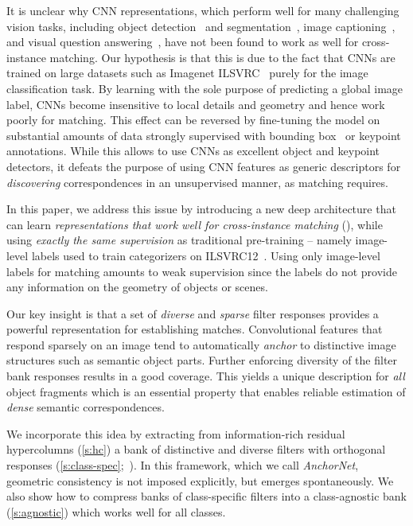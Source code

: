\documentclass[10pt,twocolumn,letterpaper]{article}
\begin{document}
It is unclear why CNN representations, which perform well for many challenging vision tasks, including object detection~\cite{girshick15fastrcnn} and segmentation~\cite{long15fcn}, image captioning~\cite{vinyals15show}, and visual question answering~\cite{antol15VQA}, have not been found to work as well for cross-instance matching. Our hypothesis is that this is due to the fact that CNNs are trained on large datasets such as Imagenet ILSVRC~\cite{deng09imagenet}  purely for the image classification task. By learning with the sole purpose of predicting a global image label, CNNs become insensitive to local details and geometry and hence work poorly for matching. This effect can be reversed by fine-tuning the model on substantial amounts of data strongly supervised with bounding box~\cite{girshick15fastrcnn} or keypoint \cite{choy16universal} annotations. While this allows to use CNNs as excellent object and keypoint detectors, it defeats the purpose of using CNN features as generic descriptors for \emph{discovering} correspondences in an unsupervised manner, as matching requires.

In this paper, we address this issue by introducing a new deep architecture %
that can learn \textit{representations that work well for cross-instance matching} (), while using \textit{exactly the same supervision} as traditional pre-training -- namely image-level labels used to train categorizers on ILSVRC12~\cite{deng09imagenet}. Using only image-level labels for matching amounts to weak supervision since the labels do not provide any information on the geometry of objects or scenes. 

Our key insight is that a set of \emph{diverse} and \emph{sparse} filter responses provides a powerful representation
for establishing matches. Convolutional features that respond sparsely on an image tend to automatically \emph{anchor} to distinctive image structures such as semantic object parts. Further enforcing diversity of the filter bank responses results in a good coverage. This yields a unique
description for \emph{all} object fragments which is an essential property that enables reliable estimation of \emph{dense} semantic correspondences.

We incorporate this idea by extracting from information-rich residual hypercolumns (\cref{s:hc}) a bank of distinctive and diverse filters with orthogonal responses (\cref{s:class-spec};~). In this framework, which we call \emph{AnchorNet}, geometric consistency is not imposed explicitly, but emerges spontaneously. We also show how to compress banks of class-specific filters into a class-agnostic bank (\cref{s:agnostic}) which works well for all classes. %
\end{document}
